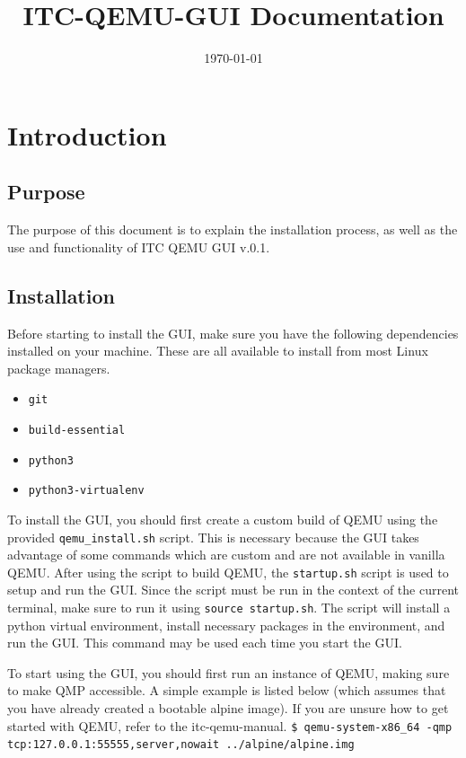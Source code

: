 \documentclass{article}
\title{ITC-QEMU-GUI \version{} Documentation}
\author{}
\date{\today}
\newcommand{\version}{v.0.1}
\newcommand{\code}[1]{\texttt{#1}}
\begin{document}
\maketitle
\tableofcontents
\newpage


\section{Introduction}

\subsection{Purpose}
The purpose of this document is to explain the installation process, as well as the use and functionality of ITC QEMU GUI \version{}.

\subsection{Installation}
Before starting to install the GUI, make sure you have the following dependencies installed on your machine. These are all available to install from most Linux package managers.
\begin{itemize}
    \item \code{git}
    \item \code{build-essential}
    \item \code{python3}
    \item \code{python3-virtualenv}
\end{itemize}

To install the GUI, you should first create a custom build of QEMU using the provided \code{qemu\_install.sh} script. This is necessary because the GUI takes advantage of some commands which are custom and are not available in vanilla QEMU. After using the script to build QEMU, the \code{startup.sh} script is used to setup and run the GUI. Since the script must be run in the context of the current terminal, make sure to run it using \code{source startup.sh}. The script will install a python virtual environment, install necessary packages in the environment, and run the GUI. This command may be used each time you start the GUI.

To start using the GUI, you should first run an instance of QEMU, making sure to make QMP accessible. A simple example is listed below (which assumes that you have already created a bootable alpine image). If you are unsure how to get started with QEMU, refer to the itc-qemu-manual. \newline \newline
\code{\$ qemu-system-x86\_64 -qmp tcp:127.0.0.1:55555,server,nowait  ../alpine/alpine.img}
\newline
\end{document}
